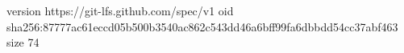 version https://git-lfs.github.com/spec/v1
oid sha256:87777ac61eccd05b500b3540ac862c543dd46a6bff99fa6dbbdd54cc37abf463
size 74
